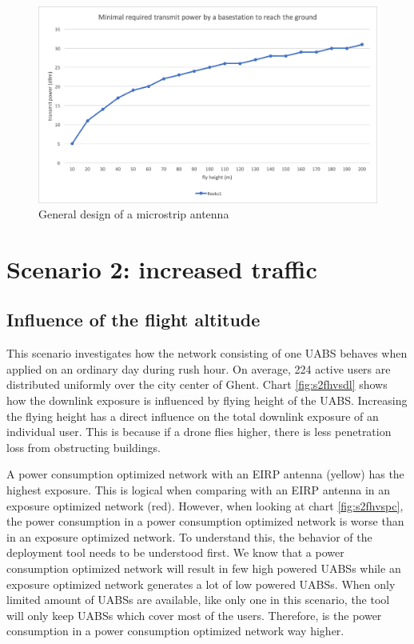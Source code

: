 \begin{figure}[h!]
  \includegraphics[width=\textwidth]{../results/s1/ptx-fh.png}
  \caption{General design of a microstrip antenna}
  \label{fig:ptxfh}
\end{figure}

\section{Scenario 2: increased traffic}

\subsection{Influence of the flight altitude}
This scenario investigates how the network consisting of one \gls{UABS} behaves when applied on an ordinary day during rush hour. 
On average, 224 active users are distributed uniformly over the city center of Ghent. 
Chart \ref{fig:s2fhvsdl} shows how the downlink exposure is influenced by flying height of the \gls{UABS}. 
Increasing the flying height has a direct influence on the total downlink exposure of an individual user. 
This is because if a drone flies higher, there is less penetration loss from obstructing buildings.

A power consumption optimized network with an \gls{EIRP} antenna (yellow) has the highest exposure. 
This is logical when comparing with an EIRP antenna in an exposure optimized network (red). 
However, when looking at chart \ref{fig:s2fhvspc}, the power consumption in a power consumption optimized network is worse 
than in an exposure optimized network. To understand this, the behavior of the deployment tool needs to be understood first. 
We know that a power consumption optimized network will result in few high powered \gls{UABS}s while an exposure optimized network 
generates a lot of low powered \gls{UABS}s. When only limited amount of \gls{UABS}s are available, 
like only one in this scenario, the tool will only keep \gls{UABS}s which cover most of the users. 
Therefore, is the power consumption in a power consumption optimized network way higher. 

